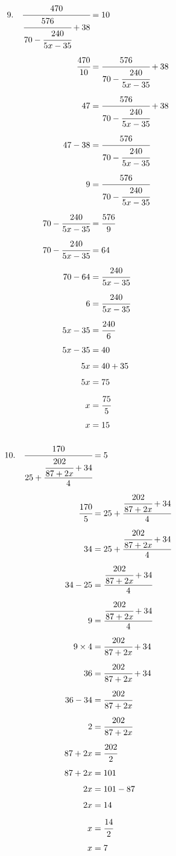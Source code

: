 \documentclass{article}
\begin{document}
\noindent
\begin{minipage}[t]{0.5000\textwidth}
\begin{align*}
9.\hspace{10pt}\cfrac{470}{\cfrac{576}{70-\cfrac{240}{5x-35}}+38}&=10\\[4pt]
\cfrac{470}{10}&=\cfrac{576}{70-\cfrac{240}{5x-35}}+38\\[4pt]
47&=\cfrac{576}{70-\cfrac{240}{5x-35}}+38\\[4pt]
47-38&=\cfrac{576}{70-\cfrac{240}{5x-35}}\\[4pt]
9&=\cfrac{576}{70-\cfrac{240}{5x-35}}\\[4pt]
70-\cfrac{240}{5x-35}&=\cfrac{576}{9}\\[4pt]
70-\cfrac{240}{5x-35}&=64\\[4pt]
70-64&=\cfrac{240}{5x-35}\\[4pt]
6&=\cfrac{240}{5x-35}\\[4pt]
5x-35&=\cfrac{240}{6}\\[4pt]
5x-35&=40\\[4pt]
5x&=40+35\\[4pt]
5x&=75\\[4pt]
x&=\cfrac{75}{5}\\[4pt]
x&=15\\[4pt]
\end{align*}
\end{minipage}
\begin{minipage}[t]{0.5000\textwidth}
\begin{align*}
10.\hspace{10pt}\cfrac{170}{25+\cfrac{\cfrac{202}{87+2x}+34}{4}}&=5\\[4pt]
\cfrac{170}{5}&=25+\cfrac{\cfrac{202}{87+2x}+34}{4}\\[4pt]
34&=25+\cfrac{\cfrac{202}{87+2x}+34}{4}\\[4pt]
34-25&=\cfrac{\cfrac{202}{87+2x}+34}{4}\\[4pt]
9&=\cfrac{\cfrac{202}{87+2x}+34}{4}\\[4pt]
9\times4&=\cfrac{202}{87+2x}+34\\[4pt]
36&=\cfrac{202}{87+2x}+34\\[4pt]
36-34&=\cfrac{202}{87+2x}\\[4pt]
2&=\cfrac{202}{87+2x}\\[4pt]
87+2x&=\cfrac{202}{2}\\[4pt]
87+2x&=101\\[4pt]
2x&=101-87\\[4pt]
2x&=14\\[4pt]
x&=\cfrac{14}{2}\\[4pt]
x&=7\\[4pt]
\end{align*}
\end{minipage}
\vspace{10 mm}
\end{document}
